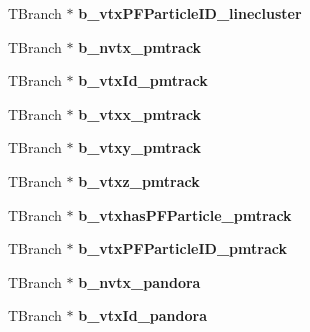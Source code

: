\begin{DoxyCompactItemize}
\item 
\hypertarget{classanatree_abf79553fcb9213b6c805b3eb8630c449}{T\-Branch $\ast$ {\bfseries b\-\_\-vtx\-P\-F\-Particle\-I\-D\-\_\-linecluster}}\label{classanatree_abf79553fcb9213b6c805b3eb8630c449}

\item 
\hypertarget{classanatree_a712ac68eb2df364e326541e83be8982c}{T\-Branch $\ast$ {\bfseries b\-\_\-nvtx\-\_\-pmtrack}}\label{classanatree_a712ac68eb2df364e326541e83be8982c}

\item 
\hypertarget{classanatree_a902ef4dfb4f5eebeb1617569910f1c5d}{T\-Branch $\ast$ {\bfseries b\-\_\-vtx\-Id\-\_\-pmtrack}}\label{classanatree_a902ef4dfb4f5eebeb1617569910f1c5d}

\item 
\hypertarget{classanatree_ab213b75d39115ddbb7200be61e65d06c}{T\-Branch $\ast$ {\bfseries b\-\_\-vtxx\-\_\-pmtrack}}\label{classanatree_ab213b75d39115ddbb7200be61e65d06c}

\item 
\hypertarget{classanatree_a7e42cae091e8acea09f7a1e1793fdf57}{T\-Branch $\ast$ {\bfseries b\-\_\-vtxy\-\_\-pmtrack}}\label{classanatree_a7e42cae091e8acea09f7a1e1793fdf57}

\item 
\hypertarget{classanatree_a8cef2626f8c7a254570369450d37b68f}{T\-Branch $\ast$ {\bfseries b\-\_\-vtxz\-\_\-pmtrack}}\label{classanatree_a8cef2626f8c7a254570369450d37b68f}

\item 
\hypertarget{classanatree_a048ce68f96d69eb0a3060d3058f63823}{T\-Branch $\ast$ {\bfseries b\-\_\-vtxhas\-P\-F\-Particle\-\_\-pmtrack}}\label{classanatree_a048ce68f96d69eb0a3060d3058f63823}

\item 
\hypertarget{classanatree_a555a82d3c8279ead8b0e1350ec066bab}{T\-Branch $\ast$ {\bfseries b\-\_\-vtx\-P\-F\-Particle\-I\-D\-\_\-pmtrack}}\label{classanatree_a555a82d3c8279ead8b0e1350ec066bab}

\item 
\hypertarget{classanatree_a954441f012e091e084b0441341e480d1}{T\-Branch $\ast$ {\bfseries b\-\_\-nvtx\-\_\-pandora}}\label{classanatree_a954441f012e091e084b0441341e480d1}

\item 
\hypertarget{classanatree_a6b0671aa6e7d8a9136795e2e82b32152}{T\-Branch $\ast$ {\bfseries b\-\_\-vtx\-Id\-\_\-pandora}}\label{classanatree_a6b0671aa6e7d8a9136795e2e82b32152}


\end{DoxyCompactItemize}
